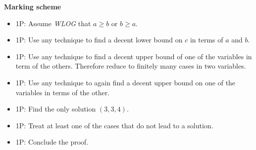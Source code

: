 \textbf{Marking scheme}
\begin{itemize}
\item 1P: Assume \emph{WLOG} that $a\geq b$ or $b\geq a$.
\item 1P: Use any technique to find a decent lower bound on $c$ in terms of $a$ and $b$.
\item 1P: Use any technique to find a decent upper bound of one of the variables in term of the others. Therefore reduce to finitely many cases in two variables.
\item 1P: Use any technique to again find a decent upper bound on one of the variables in terms of the other.
\item 1P: Find the only solution $(3,3,4)$.
\item 1P: Treat at least one of the cases that do not lead to a solution.
\item 1P: Conclude the proof.
\end{itemize}